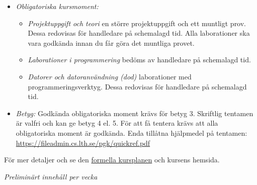 \documentclass[a4paper,12pt,oneside]{memoir}
\begin{document}
\begin{itemize}
\item
  \emph{Obligatoriska kursmoment:}

  \begin{itemize}
  \item
    \emph{Projektuppgift och teori} en större projektuppgift och ett muntligt prov. Dessa redovisas för handledare på
    schemalagd tid. Alla laborationer ska vara godkända innan du får göra det muntliga provet.
  \item
    \emph{Laborationer i programmering} bedöms av handledare på schemalagd tid.
  \item
    \emph{Datorer och datoranvändning (dod)} laborationer med programmeringsverktyg. Dessa redovisas för handledare på
    schemalagd tid.
  \end{itemize}

\item \emph{Betyg:} 
  Godkända obligatoriska moment krävs för betyg 3. Skriftlig tentamen är valfri och kan ge betyg 4 el. 5. 
  För att få tentera krävs att alla obligatoriska moment är godkända. Enda tillåtna hjälpmedel på tentamen:
  \url{https://fileadmin.cs.lth.se/pgk/quickref.pdf} \\
\end{itemize}

\noindent För mer detaljer och se den \href{https://kurser.lth.se/kursplaner/senaste/\Kurskod.html}{formella kursplanen} och kursens hemsida.

\clearpage


% 

\vspace{1.1em}\noindent\hspace*{-2.0mm}%
\noindent\textit{Preliminärt innehåll per vecka}\\~\\
\noindent\resizebox{\columnwidth}{!}
{%
{
\fontsize{8.0pt}{8.5pt}\selectfont
\begin{tabular}{l|l|p{7.4cm}}

\end{tabular}
}
}
\end{document}
